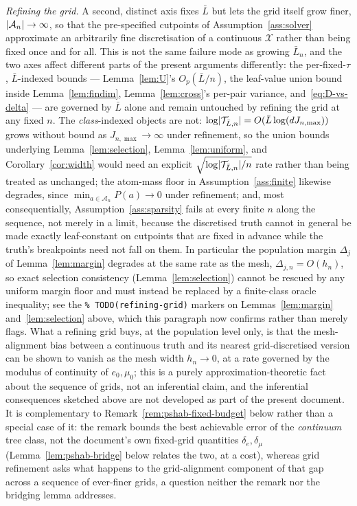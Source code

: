 \documentclass[11pt]{article}
\theoremstyle{plain}
\theoremstyle{definition}
\theoremstyle{remark}
\newcommand{\cX}{\mathcal{X}}
\newcommand{\cA}{\mathcal{A}}
\newcommand{\cT}{\mathcal{T}}
\newcommand{\ez}{e_0}
\newcommand{\mz}{\mu_0}
\DeclarePairedDelimiter{\card}{\lvert}{\rvert}
\begin{document}
\emph{Refining the grid.} A second, distinct axis fixes $\bar L$ but lets the
grid itself grow finer, $\card{\cA_n}\to\infty$, so that the pre-specified
cutpoints of Assumption~\ref{ass:solver} approximate an arbitrarily fine
discretisation of a continuous $\cX$ rather than being fixed once and for
all. This is not the same failure mode as growing $\bar L_n$, and the two
axes affect different parts of the present arguments differently: the
per-fixed-$\tau$, $\bar L$-indexed bounds --- Lemma~\ref{lem:U}'s
$O_p(\bar L/n)$, the leaf-value union bound inside Lemma~\ref{lem:findim},
Lemma~\ref{lem:cross}'s per-pair variance, and~\eqref{eq:D-vs-delta} --- are
governed by $\bar L$ alone and remain untouched by refining the grid at any
fixed $n$. The \emph{class}-indexed objects are not: $\log\card{\cT_{\bar
L,n}}=O(\bar L\log(dJ_{n,\max}))$ grows without bound as $J_{n,\max}\to\infty$
under refinement, so the union bounds underlying Lemma~\ref{lem:selection},
Lemma~\ref{lem:uniform}, and Corollary~\ref{cor:width} would need an explicit
$\sqrt{\log\card{\cT_{\bar L,n}}/n}$ rate rather than being treated as
unchanged; the atom-mass floor in Assumption~\ref{ass:finite} likewise
degrades, since $\min_{a\in\cA_n}P(a)\to0$ under refinement; and, most
consequentially, Assumption~\ref{ass:sparsity} fails at every finite $n$
along the sequence, not merely in a limit, because the discretised truth
cannot in general be made exactly leaf-constant on cutpoints that are fixed
in advance while the truth's breakpoints need not fall on them. In
particular the population margin $\Delta_j$ of Lemma~\ref{lem:margin}
degrades at the same rate as the mesh, $\Delta_{j,n}=O(h_n)$, so exact
selection consistency (Lemma~\ref{lem:selection}) cannot be rescued by any
uniform margin floor and must instead be replaced by a finite-class oracle
inequality; see the \texttt{\%~TODO(refining-grid)} markers on
Lemmas~\ref{lem:margin} and~\ref{lem:selection} above, which this paragraph
now confirms rather than merely flags. What a refining grid buys, at the
population level only, is that the mesh-alignment bias between a continuous
truth and its nearest grid-discretised version can be shown to vanish as the
mesh width $h_n\to0$, at a rate governed by the modulus of continuity of
$\ez,\mz$; this is a purely approximation-theoretic fact about the sequence
of grids, not an inferential claim, and the inferential consequences
sketched above are not developed as part of the present document. It is
complementary to Remark~\ref{rem:pshab-fixed-budget} below rather than a
special case of it: the remark bounds the best achievable error of the
\emph{continuum} tree class, not the document's own fixed-grid quantities
$\delta_e,\delta_\mu$ (Lemma~\ref{lem:pshab-bridge} below relates the two,
at a cost), whereas grid refinement asks what happens to the grid-alignment
component of that gap across a sequence of ever-finer grids, a question
neither the remark nor the bridging lemma addresses.
\end{document}
